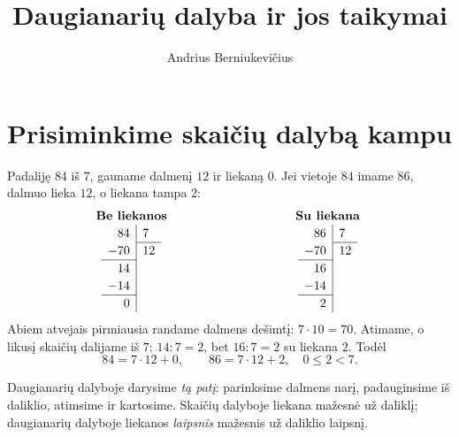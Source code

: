 \documentclass[11pt,a4paper]{scrartcl}
\title{Daugianarių dalyba ir jos taikymai}
\author{Andrius Berniukevičius}
\begin{document}
\maketitle
\section{Prisiminkime skaičių dalybą kampu}
Padaliję \(84\) iš \(7\), gauname dalmenį \(12\) ir liekaną \(0\). Jei vietoje \(84\) imame \(86\), dalmuo lieka \(12\), o liekana tampa \(2\):
\[
\begin{minipage}[t]{.46\linewidth}\centering
\textbf{Be liekanos}\par\smallskip
\(\renewcommand{\arraystretch}{1.18}
\begin{array}{r|l}
84&7\\\cline{2-2}
-70&12\\\cline{1-1}
14&\\
-14&\\\cline{1-1}
0&
\end{array}\)
\end{minipage}\hfill
\begin{minipage}[t]{.46\linewidth}\centering
\textbf{Su liekana}\par\smallskip
\(\renewcommand{\arraystretch}{1.18}
\begin{array}{r|l}
86&7\\\cline{2-2}
-70&12\\\cline{1-1}
16&\\
-14&\\\cline{1-1}
2&
\end{array}\)
\end{minipage}
\]
Abiem atvejais pirmiausia randame dalmens dešimtį: \(7\cdot10=70\). Atimame, o likusį skaičių dalijame iš \(7\): \(14:7=2\), bet \(16:7=2\) su liekana \(2\). Todėl
\[84=7\cdot12+0,\qquad 86=7\cdot12+2,\quad 0\le2<7.\]
\begin{remark*}
Daugianarių dalyboje darysime \emph{tą patį}: parinksime dalmens narį, padauginsime iš daliklio, atimsime ir kartosime. Skaičių dalyboje liekana mažesnė už daliklį; daugianarių dalyboje liekanos \emph{laipsnis} mažesnis už daliklio laipsnį.
\end{remark*}
\clearpage
\end{document}
